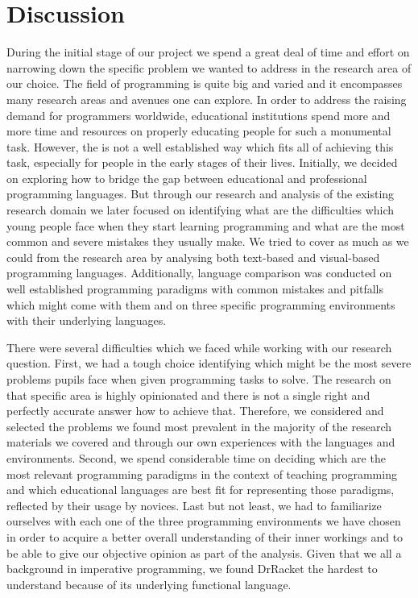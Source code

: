 \section{Discussion}
\label{sec:discussion}

During the initial stage of our project we spend a great deal of time and effort on narrowing down the specific problem we wanted to address in the research area of our choice. The field of programming is quite big and varied and it encompasses many research areas and avenues one can explore. In order to address  the raising demand for programmers worldwide, educational institutions spend more and more time and resources on properly educating people for such a monumental task. However, the is not a well established way which fits all of achieving this task, especially for people in the early stages of their lives. Initially, we decided on exploring how to bridge the gap between educational and professional programming languages. But through our research and analysis of the existing research domain we later focused on identifying what are the difficulties which young people face when they start learning programming and what are the most common and severe mistakes they usually make. We tried to cover as much as we could from the research area by analysing both text-based and visual-based programming languages. Additionally, language comparison was conducted on well established programming paradigms with common mistakes and pitfalls which might come with them and on three specific programming environments  with their underlying languages.

There were several difficulties which we faced while working with our research question. First, we had a tough choice identifying which might be the most severe problems pupils face when given programming tasks to solve. The research on that specific area is highly opinionated and there is not a single right and perfectly accurate answer how to achieve that. Therefore, we considered and selected the problems we found most prevalent in the majority of the research materials we covered and through our own experiences with the languages and environments. Second, we spend considerable time on deciding which are the most relevant programming paradigms in the context of teaching programming and which educational languages are best fit for representing those paradigms, reflected by their usage by novices. Last but not least, we had to familiarize ourselves with each one of the three programming environments we have chosen in order to acquire a better overall understanding of their inner workings and to be able to give our objective opinion as part of the analysis. Given that we all a background in imperative programming, we found DrRacket the hardest to understand because of its underlying functional language.

